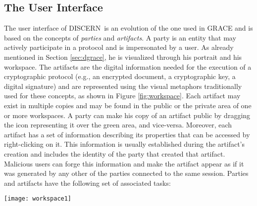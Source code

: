 \documentclass[10pt,conference]{IEEEtran}
\def\disgrace{DISCERN}
\begin{document}
\subsection{The User Interface}

The user interface of \disgrace\ is an evolution of the one used in GRACE and is based on the concepts of {\em
  parties} and {\em artifacts}. A party is an entity that may actively participate in a protocol and is
impersonated by a user. As already mentioned in Section
\ref{sec:dgrace}, he is visualized through his portrait and his
workspace. The artifacts are the digital information needed for the
execution of a cryptographic protocol (e.g., an encrypted document, a
cryptographic key, a digital signature) and are represented using the
visual metaphors traditionally used for these concepts, as shown in
Figure \ref{fig:workspace}. Each artifact may exist in multiple copies
and may be found in the public or the private area of one or more
workspaces.  A party can make his copy of an artifact public by dragging the icon
representing it over the green area, and vice-versa. Moreover, each
artifact has a set of information describing its properties that can
be accessed by right-clicking on it. This information is usually
established during the artifact's creation and includes the identity
of the party that created that artifact. Malicious users can forge
this information and make the artifact appear as if it was generated
by any other of the parties connected to the same session.  Parties
and artifacts have the following set of associated tasks:

\begin{figure*}
\centering
\texttt{[image: workspace1]}
\caption{The workspace of Alice. Her private area contains her RSA
  private key, Bob's RSA public key and an unencrypted document. Her
  public area contains her RSA public key and an encrypted copy of her
  document. She is now engaged in forging a new pair of cryptographic
  keys and, therefore, she is choosing the identity of the party to
  impersonate.}
\label{fig:workspace}
\end{figure*}
\end{document}

